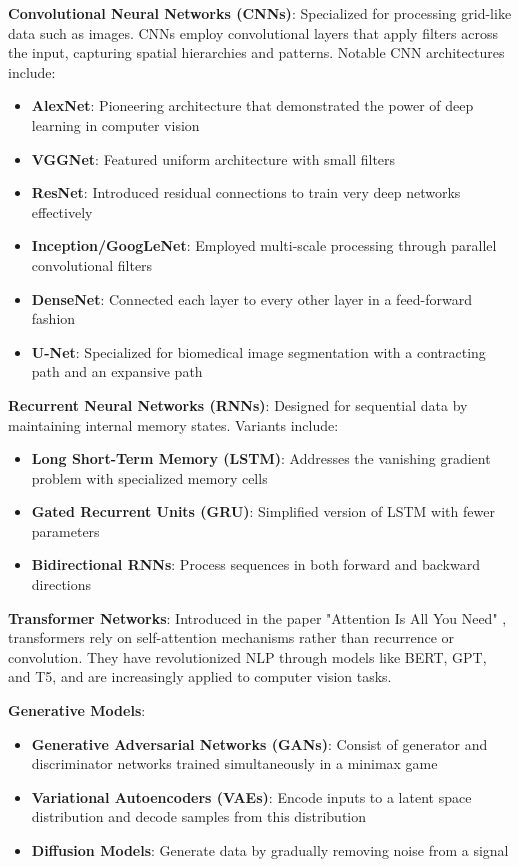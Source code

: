 \textbf{Convolutional Neural Networks (CNNs)}:
Specialized for processing grid-like data such as images. CNNs employ convolutional layers that apply filters across the input, capturing spatial hierarchies and patterns. Notable CNN architectures include:
\begin{itemize}
  \item \textbf{AlexNet}: Pioneering architecture that demonstrated the power of deep learning in computer vision \cite{krizhevsky2012imagenet}
  \item \textbf{VGGNet}: Featured uniform architecture with small filters \cite{simonyan2014very}
  \item \textbf{ResNet}: Introduced residual connections to train very deep networks effectively \cite{he2016deep}
  \item \textbf{Inception/GoogLeNet}: Employed multi-scale processing through parallel convolutional filters \cite{szegedy2015going}
  \item \textbf{DenseNet}: Connected each layer to every other layer in a feed-forward fashion \cite{huang2017densely}
  \item \textbf{U-Net}: Specialized for biomedical image segmentation with a contracting path and an expansive path \cite{ronneberger2015unet}
\end{itemize}

\textbf{Recurrent Neural Networks (RNNs)}:
Designed for sequential data by maintaining internal memory states. Variants include:
\begin{itemize}
  \item \textbf{Long Short-Term Memory (LSTM)}: Addresses the vanishing gradient problem with specialized memory cells \cite{hochreiter1997long}
  \item \textbf{Gated Recurrent Units (GRU)}: Simplified version of LSTM with fewer parameters \cite{cho2014learning}
  \item \textbf{Bidirectional RNNs}: Process sequences in both forward and backward directions
\end{itemize}

\textbf{Transformer Networks}:
Introduced in the paper "Attention Is All You Need" \cite{vaswani2017attention}, transformers rely on self-attention mechanisms rather than recurrence or convolution. They have revolutionized NLP through models like BERT, GPT, and T5, and are increasingly applied to computer vision tasks.

\textbf{Generative Models}:
\begin{itemize}
  \item \textbf{Generative Adversarial Networks (GANs)}: Consist of generator and discriminator networks trained simultaneously in a minimax game \cite{goodfellow2014generative}
  \item \textbf{Variational Autoencoders (VAEs)}: Encode inputs to a latent space distribution and decode samples from this distribution \cite{kingma2013auto}
  \item \textbf{Diffusion Models}: Generate data by gradually removing noise from a signal \cite{ho2020denoising}
\end{itemize}

